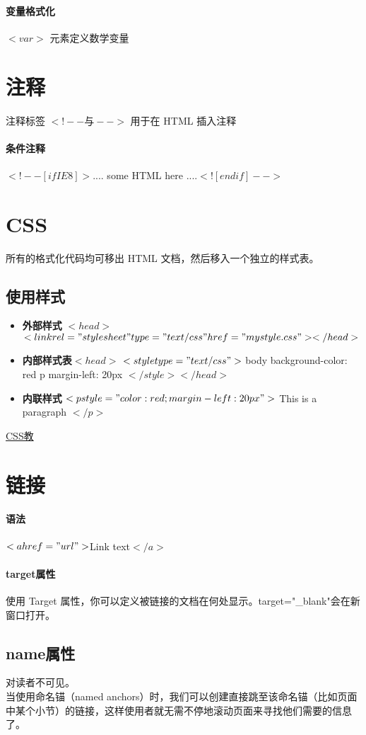 \documentclass[10pt,UTF8]{ctexart}
\begin{document}
\paragraph{变量格式化} $<var>$ 元素定义数学变量
\section{注释}
注释标签 $<!-- 与 -->$ 用于在 HTML 插入注释
\paragraph{条件注释} $<!--[if IE 8]>$.... some HTML here ....$<![endif]-->$

\section{CSS}
所有的格式化代码均可移出 HTML 文档，然后移入一个独立的样式表。
\subsection{使用样式}
\begin{itemize}
\item \textbf{外部样式} $<head>$
$<link rel="stylesheet" type="text/css" href="mystyle.css"> </head>$
\item \textbf{内部样式表}$<head>$
$<style type="text/css">$
body {background-color: red}
p {margin-left: 20px}
$</style></head>$
\item \textbf{内联样式} $<p style="color: red; margin-left: 20px">$
This is a paragraph
$</p>$
\end{itemize}
\href{http://www.w3school.com.cn/css/index.asp}{CSS教}

\section{链接}
\paragraph{语法} $<a href="url">$Link text$</a>$
\paragraph{target属性} 使用 Target 属性，你可以定义被链接的文档在何处显示。target="\_blank"会在新窗口打开。
\subsection{name属性}
对读者不可见。\\
当使用命名锚（named anchors）时，我们可以创建直接跳至该命名锚（比如页面中某个小节）的链接，这样使用者就无需不停地滚动页面来寻找他们需要的信息了。
\end{document}
